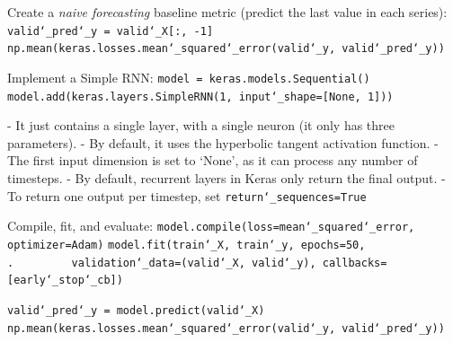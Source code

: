 Create a \textit{naive forecasting} baseline metric (predict the last value in each series):\newline
\texttt{valid\char`_pred\char`_y = valid\char`_X[:, -1]}\newline
\texttt{np.mean(keras.losses.mean\char`_squared\char`_error(valid\char`_y, valid\char`_pred\char`_y))}\newline

Implement a Simple RNN:\newline
\texttt{model = keras.models.Sequential()}\newline
\texttt{model.add(keras.layers.SimpleRNN(1, input\char`_shape=[None, 1]))}

- It just contains a single layer, with a single neuron (it only has three parameters).\newline
- By default, it uses the hyperbolic tangent activation function.\newline
- The first input dimension is set to `None', as it can process any number of timesteps.\newline
- By default, recurrent layers in Keras only return the final output.\newline
- To return one output per timestep, set \texttt{return\char`_sequences=True}

Compile, fit, and evaluate:\newline
\texttt{model.compile(loss=\textquotesingle mean\char`_squared\char`_error\textquotesingle, optimizer=\textquotesingle Adam\textquotesingle)}\newline
\texttt{model.fit(train\char`_X, train\char`_y, epochs=50,\newline
.~~~~~~~~~validation\char`_data=(valid\char`_X, valid\char`_y), callbacks=[early\char`_stop\char`_cb])}

\texttt{valid\char`_pred\char`_y = model.predict(valid\char`_X)}\newline
\texttt{np.mean(keras.losses.mean\char`_squared\char`_error(valid\char`_y, valid\char`_pred\char`_y))}


\newpage